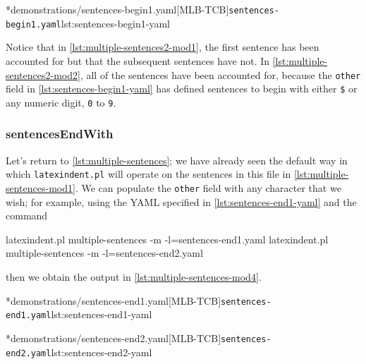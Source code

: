	\begin{minipage}{.55\linewidth}
	\end{minipage}
	\hfill
	\begin{minipage}{.45\linewidth}
		\cmhlistingsfromfile[style=yaml-LST]*{demonstrations/sentences-begin1.yaml}[MLB-TCB]{\texttt{sentences-begin1.yaml}}{lst:sentences-begin1-yaml}
	\end{minipage}
	Notice that in \cref{lst:multiple-sentences2-mod1}, the first sentence has been accounted for but that the subsequent sentences
	have not. In \cref{lst:multiple-sentences2-mod2}, all of the sentences have been accounted for, because the \texttt{other} field
	in \cref{lst:sentences-begin1-yaml} has defined sentences to begin with either \lstinline!$! or any numeric digit, \texttt{0} to \texttt{9}.

\subsubsection{sentencesEndWith}
	Let's return to \vref{lst:multiple-sentences}; we have already seen the default way in which \texttt{latexindent.pl} will operate on the
	sentences in this file in \vref{lst:multiple-sentences-mod1}. We can populate the \texttt{other} field with any character that we wish;
	for example, using the YAML specified in \cref{lst:sentences-end1-yaml} and the command
	\begin{commandshell}
latexindent.pl multiple-sentences -m -l=sentences-end1.yaml
latexindent.pl multiple-sentences -m -l=sentences-end2.yaml
\end{commandshell}
	then we obtain the output in \cref{lst:multiple-sentences-mod4}.

	\begin{minipage}{.5\linewidth}
	\end{minipage}
	\hfill
	\begin{minipage}{.5\linewidth}
		\cmhlistingsfromfile[style=yaml-LST]*{demonstrations/sentences-end1.yaml}[MLB-TCB]{\texttt{sentences-end1.yaml}}{lst:sentences-end1-yaml}
	\end{minipage}

	\begin{minipage}{.5\linewidth}
	\end{minipage}
	\hfill
	\begin{minipage}{.5\linewidth}
		\cmhlistingsfromfile[style=yaml-LST]*{demonstrations/sentences-end2.yaml}[MLB-TCB]{\texttt{sentences-end2.yaml}}{lst:sentences-end2-yaml}
	\end{minipage}

